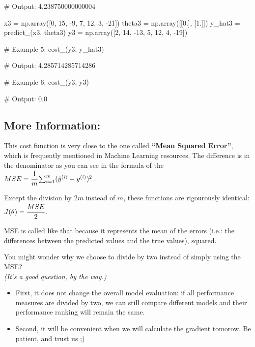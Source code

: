 \documentclass[]{article}
\newenvironment{Shaded}{\begin{snugshade}}{\end{snugshade}}
\newcommand{\CommentTok}[1]{\textcolor[rgb]{0.48,0.49,0.49}{#1}}
\newcommand{\DecValTok}[1]{\textcolor[rgb]{0.96,0.45,0.00}{#1}}
\newcommand{\FloatTok}[1]{\textcolor[rgb]{0.96,0.45,0.00}{#1}}
\newcommand{\NormalTok}[1]{\textcolor[rgb]{0.81,0.81,0.76}{#1}}
\newcommand{\OperatorTok}[1]{\textcolor[rgb]{0.81,0.81,0.76}{#1}}
\begin{document}
\begin{Shaded}
\begin{Highlighting}[]
\CommentTok{# Output:}
\FloatTok{4.238750000000004}

\NormalTok{x3 }\OperatorTok{=}\NormalTok{ np.array([}\DecValTok{0}\NormalTok{, }\DecValTok{15}\NormalTok{, }\DecValTok{-9}\NormalTok{, }\DecValTok{7}\NormalTok{, }\DecValTok{12}\NormalTok{, }\DecValTok{3}\NormalTok{, }\DecValTok{-21}\NormalTok{])}
\NormalTok{theta3 }\OperatorTok{=}\NormalTok{ np.array([[}\FloatTok{0.}\NormalTok{], [}\FloatTok{1.}\NormalTok{]])}
\NormalTok{y_hat3 }\OperatorTok{=}\NormalTok{ predict_(x3, theta3)}
\NormalTok{y3 }\OperatorTok{=}\NormalTok{ np.array([}\DecValTok{2}\NormalTok{, }\DecValTok{14}\NormalTok{, }\DecValTok{-13}\NormalTok{, }\DecValTok{5}\NormalTok{, }\DecValTok{12}\NormalTok{, }\DecValTok{4}\NormalTok{, }\DecValTok{-19}\NormalTok{])}

\CommentTok{# Example 5:}
\NormalTok{cost_(y3, y_hat3)}

\CommentTok{# Output:}
\FloatTok{4.285714285714286}

\CommentTok{# Example 6:}
\NormalTok{cost_(y3, y3)}

\CommentTok{# Output:}
\FloatTok{0.0}
\end{Highlighting}
\end{Shaded}

\hypertarget{more-information-1}{%
\subsection{More Information:}\label{more-information-1}}

This cost function is very close to the one called \textbf{``Mean
Squared Error''}, which is frequently mentioned in Machine Learning
resources. The difference is in the denominator as you can see in the
formula of the
\(MSE = \cfrac{1}{m}\sum_{i=1}^{m}(\hat{y}^{(i)} - y^{(i)})^2\).

Except the division by \(2m\) instead of \(m\), these functions are
rigourously identical: \(J(\theta) = \cfrac{MSE}{2}\).

MSE is called like that because it represents the mean of the errors
(i.e.: the differences between the predicted values and the true
values), squared.

You might wonder why we choose to divide by two instead of simply using
the MSE?\\
\emph{(It's a good question, by the way.)}

\begin{itemize}
\item
  First, it does not change the overall model evaluation: if all
  performance measures are divided by two, we can still compare
  different models and their performance ranking will remain the same.
\item
  Second, it will be convenient when we will calculate the gradient
  tomorow. Be patient, and trust us ;)
\end{itemize}
\end{document}
